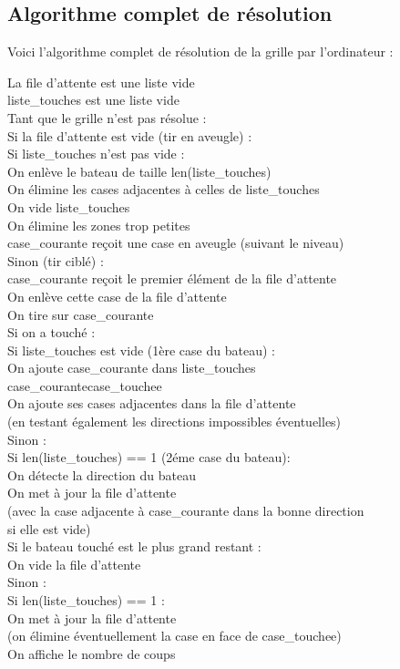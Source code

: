 \newpage
\subsection{Algorithme complet de résolution}\label{algo_resolution}
Voici l'algorithme complet de résolution de la grille par l'ordinateur :

\begin{algo1}
La file d'attente est une liste vide\\
liste\_touches est une liste vide\\
Tant que le grille n'est pas résolue :\\
Si la file d'attente est vide (tir en aveugle) :\\
Si liste\_touches n'est pas vide :\\
On enlève le bateau de taille len(liste\_touches)\\
On élimine les cases adjacentes à celles de liste\_touches\\
On vide liste\_touches\\
On élimine les zones trop petites\\
case\_courante reçoit une case en aveugle (suivant le niveau)\\
Sinon (tir ciblé) :\\
case\_courante reçoit le premier élément de la file d'attente\\
On enlève cette case de la file d'attente\\
On tire sur case\_courante\\
Si on a touché :\\
Si liste\_touches est vide (1ère case du bateau) :\\
On ajoute case\_courante dans liste\_touches\\
case\_courante\sto case\_touchee\\
On ajoute ses cases adjacentes dans la file d'attente\\
(en testant également les directions impossibles éventuelles)\\
Sinon :\\
Si len(liste\_touches) == 1 (2éme case du bateau):\\
On détecte la direction du bateau\\
On met à jour la file d'attente\\
(avec la case adjacente à case\_courante dans la bonne direction\\
 si elle est vide)\\
Si le bateau touché est le plus grand restant :\\
On vide la file d'attente\\
Sinon :\\
Si len(liste\_touches) == 1 :\\
On met à jour la file d'attente\\
(on élimine éventuellement la case en face de case\_touchee)\\
On affiche le nombre de coups\\
\end{algo1}

